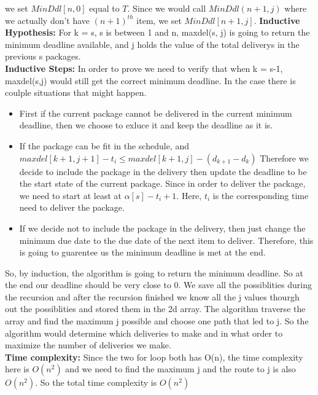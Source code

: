 \documentclass[14pt]{article}
\begin{document}
\begin{enumerate}
    we set $MinDdl[n,0]$ equal to $T$. Since we would call $MinDdl(n+1,j)$ where we actually 
    don't have $(n+1)^{th}$ item, we set $MinDdl[n+1,j]$.
    \textbf{Inductive Hypothesis:} For k = s, s is between 1 and n, maxdel(s, j) 
    is going to return the minimum deadline available, and j holds the value of the
    total deliverys in the previous s packages.\\
    \textbf{Inductive Steps:} In order to prove we need to verify that when 
    k = s-1, maxdel(s,j) would still get the correct minimum deadline.
    In the case there is coulple situations that might happen.
    \begin{itemize}
        \item First if the current package cannot be delivered in the current 
        minimum deadline, then we choose to exluce it and keep the deadline as 
        it is.
        \item If the package can be fit in the schedule, and 
        $maxdel[k+1, j+1] -t_i \leq maxdel[k+1,j] -(d_{k+1}-d_k)$
        Therefore we decide to include the
        package in the delivery then update the deadline
        to be the start state of the current package. Since in order to deliver
        the package, we need to start at least at $\alpha[s]- t_i +1$. Here, $t_i$
        is the corresponding time need to deliver the package.
        \item If we decide not to include the package in the delivery, then just
        change the minimum due date to the due date of the next item to deliver.
        Therefore, this is going to guarentee us the minimum deadline is met at 
        the end. 
    \end{itemize}
    So, by induction, the algorithm is going to return the minimum deadline. So
    at the end our deadline should be very close to 0. We save all the possiblities
    during the recursion and after the recursion finished we know all the j values
    thourgh out the possiblities and stored them in the 2d array. The algorithm
    traverse the array and find the maximum j possible and choose one path that 
    led to j. So the algorithm would determine which deliveries to make and in 
    what order to maximize the number of deliveries we make.\\
    \textbf{Time complexity: } Since the two for loop both has O(n), the time
    complexity here is  $O(n^2)$ and we need to find the maximum j and the route 
    to j is also $O(n^2)$. So the total time complexity is $O(n^2)$

\end{enumerate}
\end{document}
